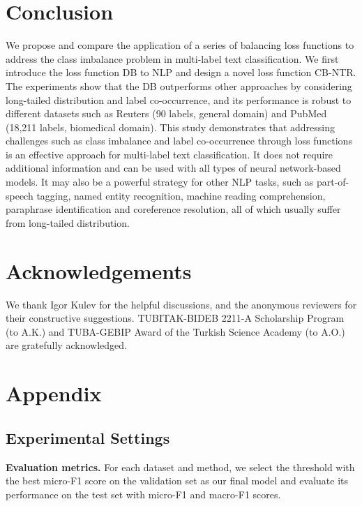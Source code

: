 \documentclass[11pt]{article}
\begin{document}
\section{Conclusion}
We propose and compare the application of a series of balancing loss functions  to address the class imbalance problem in multi-label text classification. We first introduce the loss function DB to NLP and design a novel loss function CB-NTR.
The experiments show that the DB outperforms other approaches by considering long-tailed distribution and label co-occurrence, and its performance is robust to different datasets such as Reuters (90 labels, general domain) and PubMed (18,211 labels, biomedical domain).  This study demonstrates that addressing challenges such as class imbalance and label co-occurrence through loss functions is an effective approach for multi-label text classification.
It does not require additional information 
and can be used with all types of neural network-based models. It
may also be a powerful strategy for other NLP tasks, such as part-of-speech tagging, named entity recognition, machine reading comprehension, paraphrase identification and coreference resolution, all of which usually suffer from long-tailed distribution. 









\section*{Acknowledgements}
We thank Igor Kulev for the helpful discussions, and the anonymous reviewers for their constructive suggestions.
TUBITAK-BIDEB 2211-A Scholarship Program (to A.K.) and TUBA-GEBIP Award of the Turkish Science Academy (to A.O.) are gratefully acknowledged.





\clearpage
\appendix
\section{Appendix}
\label{sec:appendix}

\subsection{Experimental Settings}
\textbf{Evaluation metrics.} For each dataset and method, we select the threshold with the best micro-F1 score on the validation set as our final model and evaluate its performance on the test set with micro-F1 and macro-F1 scores.
\end{document}
